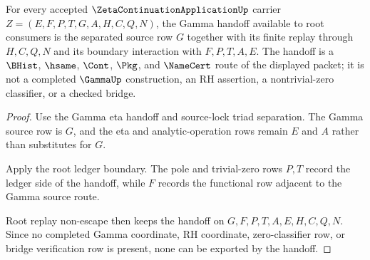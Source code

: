 \begin{theorem}
\label{thm:zeta-continuation-application-root-gamma-handoff-readiness}
For every accepted $\ZetaContinuationApplicationUp$ carrier
$Z=(E,F,P,T,G,A,H,C,Q,N)$, the Gamma handoff available to root consumers is the
separated source row $G$ together with its finite replay through $H,C,Q,N$ and
its boundary interaction with $F,P,T,A,E$. The handoff is a $\BHist$,
$\hsame$, $\Cont$, $\Pkg$, and $\NameCert$ route of the displayed packet; it is
not a completed $\GammaUp$ construction, an RH assertion, a nontrivial-zero
classifier, or a checked bridge.
\end{theorem}
\begin{proof}
Use the Gamma eta handoff and source-lock triad separation. The Gamma source
row is $G$, and the eta and analytic-operation rows remain $E$ and $A$ rather
than substitutes for $G$.

Apply the root ledger boundary. The pole and trivial-zero rows $P,T$ record the
ledger side of the handoff, while $F$ records the functional row adjacent to the
Gamma source route.

Root replay non-escape then keeps the handoff on $G,F,P,T,A,E,H,C,Q,N$. Since
no completed Gamma coordinate, RH coordinate, zero-classifier row, or bridge
verification row is present, none can be exported by the handoff.
\end{proof}

